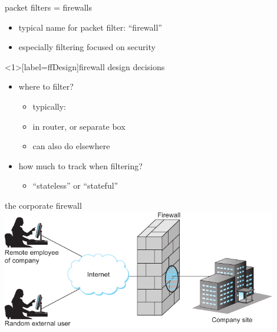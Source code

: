 \begin{frame}{packet filters = firewalls}
    \begin{itemize}
    \item typical name for packet filter: ``firewall''
    \item especially filtering focused on security
    \end{itemize}
\end{frame}

\begin{frame}<1>[label=ffDesign]{firewall design decisions}
    \begin{itemize}
    \item where to filter?
        \begin{itemize}
        \item typically: 
        \item in router, or separate box
        \item can also do elsewhere
        \end{itemize}
    \item how much to track when filtering?
        \begin{itemize}
        \item ``stateless'' or ``stateful''
        \end{itemize}
    \end{itemize}
\end{frame}

\begin{frame}{the corporate firewall}
\includegraphics[width=0.9\textwidth]{sysapp-fig214}
\end{frame}


